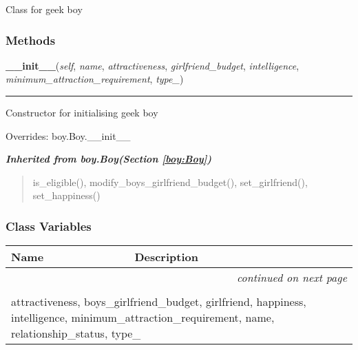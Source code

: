Class for geek boy



  \subsubsection{Methods}

    \vspace{0.5ex}

\hspace{.8\funcindent}\begin{boxedminipage}{\funcwidth}

    \raggedright \textbf{\_\_init\_\_}(\textit{self}, \textit{name}, \textit{attractiveness}, \textit{girlfriend\_budget}, \textit{intelligence}, \textit{minimum\_attraction\_requirement}, \textit{type\_})

    \vspace{-1.5ex}

    \rule{\textwidth}{0.5\fboxrule}
\setlength{\parskip}{2ex}
    Constructor for initialising geek boy

\setlength{\parskip}{1ex}
      Overrides: boy.Boy.\_\_init\_\_

    \end{boxedminipage}


\large{\textbf{\textit{Inherited from boy.Boy\textit{(Section \ref{boy:Boy})}}}}

\begin{quote}
is\_eligible(), modify\_boys\_girlfriend\_budget(), set\_girlfriend(), set\_happiness()
\end{quote}


  \subsubsection{Class Variables}

    \vspace{-1cm}
\hspace{\varindent}\begin{longtable}{|p{\varnamewidth}|p{\vardescrwidth}|l}
\cline{1-2}
\cline{1-2} \centering \textbf{Name} & \centering \textbf{Description}& \\
\cline{1-2}
\endhead\cline{1-2}\multicolumn{3}{r}{\small\textit{continued on next page}}\\\endfoot\cline{1-2}
\endlastfoot\multicolumn{2}{|l|}{\textit{Inherited from boy.Boy \textit{(Section \ref{boy:Boy})}}}\\
\multicolumn{2}{|p{\varwidth}|}{\raggedright attractiveness, boys\_girlfriend\_budget, girlfriend, happiness, intelligence, minimum\_attraction\_requirement, name, relationship\_status, type\_}\\
\cline{1-2}
\end{longtable}

